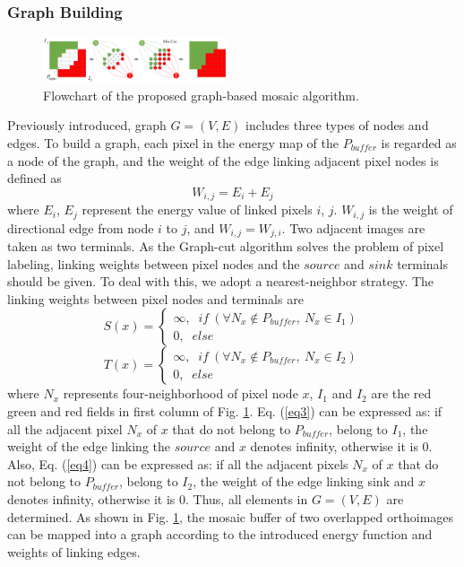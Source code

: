 \documentclass[journal]{IEEEtran}
\begin{document}
\subsubsection{Graph Building}
\begin{figure}[!t]
	\centering
	\includegraphics[width=0.48\textwidth]{link}
	\caption{Flowchart of the proposed graph-based mosaic algorithm.}
	\label{fig:link}
\end{figure}
Previously introduced, graph $G=\left(V, E \right)$ includes three types of nodes and edges. To build a graph, each pixel in the energy map of the $P_{buffer}$ is regarded as a node of the graph, and the weight of the edge linking adjacent pixel nodes is defined as
\begin{equation}\label{eq2}
W_{i,j}=E_{i}+E_{j}
\end{equation}
where $E_i$, $E_j$ represent the energy value of linked pixels $i$, $j$. $W_{i,j}$ is the weight of directional edge from node $i$ to $j$, and $W_{i,j}=W_{j,i}$. Two adjacent images are taken as two terminals. As the Graph-cut algorithm solves the problem of pixel labeling, linking weights between pixel nodes and the $source$ and $sink$ terminals should be given. To deal with this, we adopt a nearest-neighbor strategy. The linking weights between pixel nodes and terminals are
\begin{equation}\label{eq3}
S(x)= \left\{ {\begin{array}{*{20}{c}}
	{\infty,\;\;if~(\forall N_{x}\notin P_{buffer},~N_{x}\in I_{1})}\\
	{0 ,\;\;else}
	\end{array}} \right.
\end{equation}
\begin{equation}\label{eq4}
T(x)= \left\{ {\begin{array}{*{20}{c}} 
	{\infty,\;\;if~(\forall N_{x}\notin P_{buffer},~N_{x}\in I_{2})}\\
	{0 ,\;\;else}
	\end{array}} \right.
\end{equation}
where $N_x$ represents four-neighborhood of pixel node $x$, $I_{1}$ and $I_{2}$ are the red green and red fields in first column of Fig. \ref{fig:link}. Eq. (\ref{eq3}) can be expressed as: if all the adjacent pixel $N_x$ of $x$ that do not belong to $P_{buffer}$, belong to $I_1$, the weight of the edge linking the $source$ and $x$ denotes infinity, otherwise it is 0. Also, Eq. (\ref{eq4}) can be expressed as: if all the adjacent pixels $N_x$ of $x$ that do not belong to $P_{buffer}$, belong to $I_2$, the weight of the edge linking sink and $x$ denotes infinity, otherwise it is 0. Thus, all elements in $G= (V, E)$ are determined. As shown in Fig. \ref{fig:link}, the mosaic buffer of two overlapped orthoimages can be mapped into a graph according to the introduced energy function and weights of linking edges.
\end{document}
